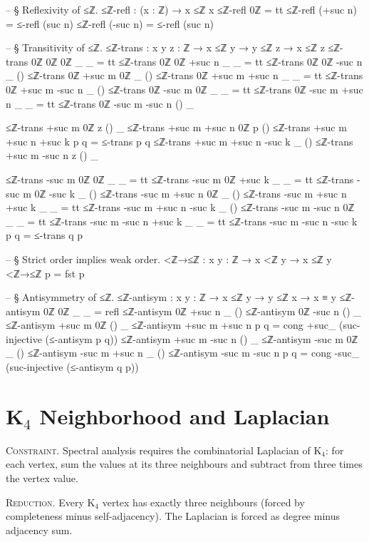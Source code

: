 \documentclass[11pt,a4paper]{book}
\begin{document}
\begin{code}
-- § Reflexivity of ≤ℤ.
≤ℤ-refl : (x : ℤ) → x ≤ℤ x
≤ℤ-refl 0ℤ = tt
≤ℤ-refl (+suc n) = ≤-refl (suc n)
≤ℤ-refl (-suc n) = ≤-refl (suc n)

-- § Transitivity of ≤ℤ.
≤ℤ-trans : {x y z : ℤ} → x ≤ℤ y → y ≤ℤ z → x ≤ℤ z
≤ℤ-trans {0ℤ} {0ℤ} {0ℤ} _ _ = tt
≤ℤ-trans {0ℤ} {0ℤ} {+suc n} _ _ = tt
≤ℤ-trans {0ℤ} {0ℤ} { -suc n } _ ()
≤ℤ-trans {0ℤ} {+suc m} {0ℤ} _ ()
≤ℤ-trans {0ℤ} {+suc m} {+suc n} _ _ = tt
≤ℤ-trans {0ℤ} {+suc m} { -suc n } _ ()
≤ℤ-trans {0ℤ} { -suc m } {0ℤ} _ _ = tt
≤ℤ-trans {0ℤ} { -suc m } {+suc n} _ _ = tt
≤ℤ-trans {0ℤ} { -suc m } { -suc n } () _

≤ℤ-trans {+suc m} {0ℤ} {z} () _
≤ℤ-trans {+suc m} {+suc n} {0ℤ} p ()
≤ℤ-trans {+suc m} {+suc n} {+suc k} p q = ≤-trans p q
≤ℤ-trans {+suc m} {+suc n} { -suc k } _ ()
≤ℤ-trans {+suc m} { -suc n } {z} () _

≤ℤ-trans { -suc m } {0ℤ} {0ℤ} _ _ = tt
≤ℤ-trans { -suc m } {0ℤ} {+suc k} _ _ = tt
≤ℤ-trans { -suc m } {0ℤ} { -suc k } _ ()
≤ℤ-trans { -suc m } {+suc n} {0ℤ} _ ()
≤ℤ-trans { -suc m } {+suc n} {+suc k} _ _ = tt
≤ℤ-trans { -suc m } {+suc n} { -suc k } _ ()
≤ℤ-trans { -suc m } { -suc n } {0ℤ} _ _ = tt
≤ℤ-trans { -suc m } { -suc n } {+suc k} _ _ = tt
≤ℤ-trans { -suc m } { -suc n } { -suc k } p q = ≤-trans q p

-- § Strict order implies weak order.
<ℤ→≤ℤ : {x y : ℤ} → x <ℤ y → x ≤ℤ y
<ℤ→≤ℤ p = fst p

-- § Antisymmetry of ≤ℤ.
≤ℤ-antisym : {x y : ℤ} → x ≤ℤ y → y ≤ℤ x → x ≡ y
≤ℤ-antisym {0ℤ} {0ℤ} _ _ = refl
≤ℤ-antisym {0ℤ} {+suc n} _ ()
≤ℤ-antisym {0ℤ} { -suc n } () _
≤ℤ-antisym {+suc m} {0ℤ} () _
≤ℤ-antisym {+suc m} {+suc n} p q = cong +suc_ (suc-injective (≤-antisym p q))
≤ℤ-antisym {+suc m} { -suc n } () _
≤ℤ-antisym { -suc m } {0ℤ} _ ()
≤ℤ-antisym { -suc m } {+suc n} _ ()
≤ℤ-antisym { -suc m } { -suc n } p q = cong -suc_ (suc-injective (≤-antisym q p))
\end{code}

\chapter{K$_4$ Neighborhood and Laplacian}

\textsc{Constraint.}
Spectral analysis requires the combinatorial Laplacian of K$_4$: for each vertex,
sum the values at its three neighbours and subtract from three times the vertex value.

\textsc{Reduction.}
Every K$_4$ vertex has exactly three neighbours (forced by completeness minus
self-adjacency). The Laplacian is forced as degree minus adjacency sum.
\end{document}
